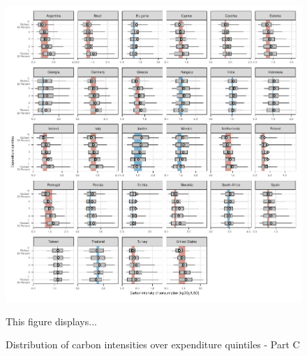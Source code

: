 \documentclass[12pt, a4paper]{article}
\newenvironment{subcaption}
{\strut
\vspace{-5pt}
\begin{minipage}[b]{0.9\textwidth}
  \hspace*{-\parindent}
  \footnotesize}
 {\end{minipage}}
\begin{document}
\begin{figure}[ht!]
  \centering
  \caption{Distribution of carbon intensities over expenditure quintiles - Part C} \label{fig:Quint_C}
  \includegraphics{1_Figures/Figures_Appendix/Figure_1_2017_Appendix_3}
  \begin{subcaption}
    This figure displays...
  \end{subcaption}

\end{figure}

\clearpage


\end{document}
